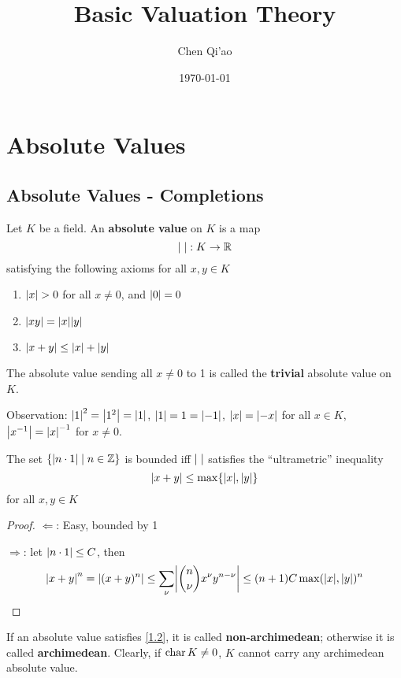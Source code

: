 \documentclass[11pt]{article}
\author{Chen Qi'ao}
\date{\today}
\title{Basic Valuation Theory}
\begin{document}
\maketitle
\section{Absolute Values}
\label{sec:org51d1aca}
\subsection{Absolute Values - Completions}
\label{sec:org4189f9b}
Let \(K\) be a field. An \textbf{absolute value} on \(K\) is a map
\begin{equation*}
\abs{\;}:K\to\R
\end{equation*}
satisfying the following axioms for all \(x,y\in K\)
\begin{enumerate}
\item \(\abs{x}>0\) for all \(x\neq 0\), and \(\abs{0}=0\)
\item \(\abs{xy}=\abs{x}\abs{y}\)
\item \(\abs{x+y}\le\abs{x}+\abs{y}\)
\end{enumerate}

The absolute value sending all \(x\neq 0\) to 1 is called the \textbf{trivial} absolute value on \(K\).

Observation: \(\abs{1}^2=\abs{1^2}=\abs{1}\), \(\abs{1}=1=\abs{-1}\), \(\abs{x}=\abs{-x}\) for all
\(x\in K\), \(\abs{x^{-1}}=\abs{x}^{-1}\) for \(x\neq 0\).

\begin{proposition}[]
The set \(\{\abs{n\cdot 1}\mid n\in\Z\}\) is bounded iff \(\abs{\;}\) satisfies the ``ultrametric'' inequality
\begin{equation}
\label{1.2}
\abs{x+y}\le\max\{\abs{x},\abs{y}\}
\end{equation}
for all \(x,y\in K\)
\end{proposition}

\begin{proof}
\(\Leftarrow\): Easy, bounded by 1

\(\Rightarrow\): let \(\abs{n\cdot 1}\le C\), then
\begin{equation*}
\abs{x+y}^n=\abs{(x+y)^n}\le\sum_\nu\abs{\binom{n}{\nu}x^\nu y^{n-\nu}}\le(n+1)C\max(\abs{x},\abs{y})^n
\end{equation*}
\end{proof}

If an absolute value satisfies \eqref{1.2}, it is called \textbf{non-archimedean}; otherwise it is called
\textbf{archimedean}. Clearly, if \(\operatorname{char} K\neq 0\), \(K\) cannot carry any archimedean absolute value.
\end{document}
